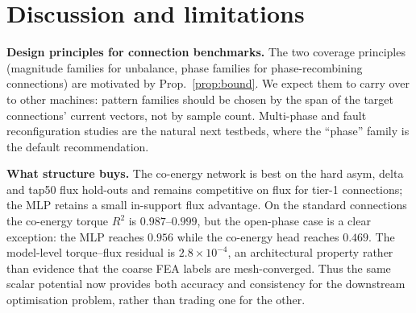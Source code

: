 \documentclass[review]{elsarticle}
\begin{document}
\begin{table}[t]
\centering\small
\caption{Drive-cycle case study: WLTC class-1, 540-kg single-motor EV,
320-V SiC drive, gear 13, 11.43\,km, all modelled losses counted, minimum
dwell 10\,s. All strategies complete the cycle.}
\label{tab:drive}
\end{table}

\section{Discussion and limitations}
\label{sec:discussion}

\textbf{Design principles for connection benchmarks.} The two coverage
principles (magnitude families for unbalance, phase families for
phase-recombining connections) are motivated by
Prop.~\ref{prop:bound}. We expect them to carry over to other
machines: pattern families should be chosen by the span of the target
connections' current vectors, not by sample count. Multi-phase and fault
reconfiguration studies are the natural next testbeds, where the
``phase'' family is the default recommendation.

\textbf{What structure buys.} The co-energy network is best on the hard
asym, delta and tap50 flux hold-outs and remains competitive on flux for
tier-1 connections; the MLP retains a small in-support flux advantage. On
the standard connections the co-energy torque $R^2$ is $0.987$--$0.999$,
but the open-phase case is a clear exception: the MLP reaches $0.956$ while
the co-energy head reaches $0.469$. The model-level torque--flux residual is
$2.8\times10^{-4}$, an architectural property rather than evidence that the
coarse FEA labels are mesh-converged. Thus
the same scalar potential now provides both accuracy and consistency for
the downstream optimisation problem, rather than trading one for the
other.
\end{document}
